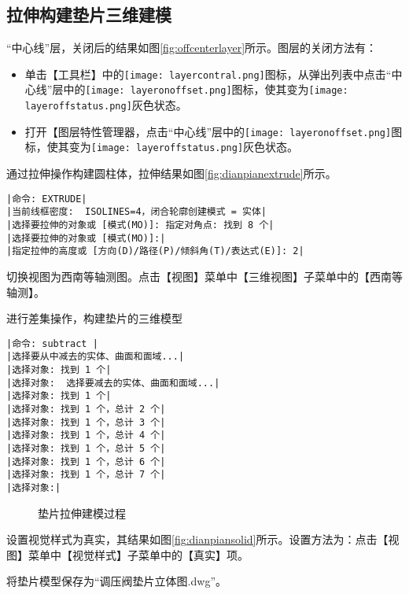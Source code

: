 \subsection{拉伸构建垫片三维建模}
\begin{procedure}
“中心线”层，关闭后的结果如图\ref{fig:offcenterlayer}所示。图层的关闭方法有：
\begin{itemize}
\item 单击【工具栏】中的\texttt{[image: layercontral.png]}图标，从弹出列表中点击“中心线”层中的\texttt{[image: layeronoffset.png]}图标，使其变为\texttt{[image: layeroffstatus.png]}灰色状态。
\item 打开【图层特性管理器，点击“中心线”层中的\texttt{[image: layeronoffset.png]}图标，使其变为\texttt{[image: layeroffstatus.png]}灰色状态。
\end{itemize}
\item 通过拉伸操作构建圆柱体，拉伸结果如图\ref{fig:dianpianextrude}所示。
\begin{lstlisting}
|命令: EXTRUDE|
|当前线框密度:  ISOLINES=4，闭合轮廓创建模式 = 实体|
|选择要拉伸的对象或 [模式(MO)]: 指定对角点: 找到 8 个|
|选择要拉伸的对象或 [模式(MO)]:|
|指定拉伸的高度或 [方向(D)/路径(P)/倾斜角(T)/表达式(E)]: 2|
\end{lstlisting}
\item 切换视图为西南等轴测图。点击【视图】菜单中【三维视图】子菜单中的【西南等轴测】。
\item 进行差集操作，构建垫片的三维模型
\begin{lstlisting}
|命令: subtract |
|选择要从中减去的实体、曲面和面域...|
|选择对象: 找到 1 个|
|选择对象:  选择要减去的实体、曲面和面域...|
|选择对象: 找到 1 个|
|选择对象: 找到 1 个，总计 2 个|
|选择对象: 找到 1 个，总计 3 个|
|选择对象: 找到 1 个，总计 4 个|
|选择对象: 找到 1 个，总计 5 个|
|选择对象: 找到 1 个，总计 6 个|
|选择对象: 找到 1 个，总计 7 个|
|选择对象:|
\end{lstlisting}
\begin{figure}[htbp]
\centering
{}\hspace{20pt}
\hspace{20pt}
\caption{垫片拉伸建模过程}
\end{figure}
\item 设置视觉样式为真实，其结果如图\ref{fig:dianpiansolid}所示。设置方法为：点击【视图】菜单中【视觉样式】子菜单中的【真实】项。
\item 将垫片模型保存为“调压阀垫片立体图.dwg”。
\end{procedure}

